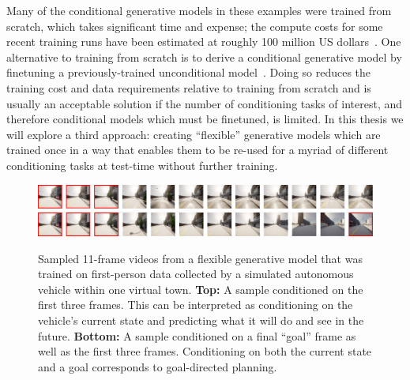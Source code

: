 Many of the conditional generative models in these examples were trained from scratch, which takes significant time and expense; the compute costs for some recent training runs have been estimated at roughly 100 million US dollars~\citep{knight2023openai,stanford2024artificial}. One alternative to training from scratch is to derive a conditional generative model by finetuning a previously-trained unconditional model~\citep{tian2023control,sheynin2023emu}. Doing so reduces the training cost and data requirements relative to training from scratch and is usually an acceptable solution if the number of conditioning tasks of interest, and therefore conditional models which must be finetuned, is limited. In this thesis we will explore a third approach: creating ``flexible'' generative models which are trained once in a way that enables them to be re-used for a myriad of different conditioning tasks at test-time without further training.

\begin{figure}
    \centering
    \includegraphics[width=\textwidth]{figs/thesis/fdm-example-tasks/world-modeling-thesis.pdf}
    \includegraphics[width=\textwidth]{figs/thesis/fdm-example-tasks/visual-planning-thesis.pdf}
    \caption{Sampled 11-frame videos from a flexible generative model that was trained on first-person data collected by a simulated autonomous vehicle within one virtual town. \textbf{Top:} A sample conditioned on the first three frames. This can be interpreted as conditioning on the vehicle's current state and predicting what it will do and see in the future. \textbf{Bottom:} A sample conditioned on a final ``goal'' frame as well as the first three frames. Conditioning on both the current state and a goal corresponds to goal-directed planning. }
    \label{fig:intro-world-modeling-and-planning}
\end{figure}

